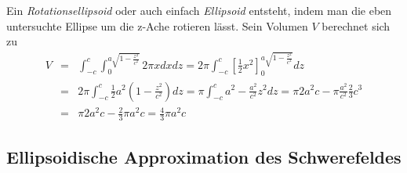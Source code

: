 \documentclass{book}
\begin{document}
%
Ein \textit{Rotationsellipsoid} oder auch einfach \textit{Ellipsoid} entsteht, indem man die eben untersuchte Ellipse um die z-Ache rotieren lässt. Sein Volumen $V$ berechnet sich zu
%
\begin{eqnarray}
V & = & \int_{ - c}^{c}\int_{0}^{a\sqrt{1 - \frac{z^2}{c^2}}}2\pi xdxdz = 2\pi\int_{ - c}^{c}\left[\frac{1}{2}x^2\right]_0^{a\sqrt{1 - \frac{z^2}{c^2}}}dz\nonumber\\
& = & 2\pi\int_{ - c}^{c}\frac{1}{2}a^2\left(1 - \frac{z^2}{c^2}\right)dz = \pi\int_{ - c}^{c}a^2 - \frac{a^2}{c^2}z^2dz = \pi 2a^2c - \pi\frac{a^2}{c^2}\frac{2}{3}c^3\nonumber\\
& = & \pi 2a^2c - \frac{2}{3}\pi a^2c = \frac{4}{3}\pi a^2c\label{eq:vol_rot_ellipsoid}
\end{eqnarray}

\subsection{Ellipsoidische Approximation des Schwerefeldes}
\label{sec:ellipsoidische_approximation_des_schwerefeldes}
\end{document}
